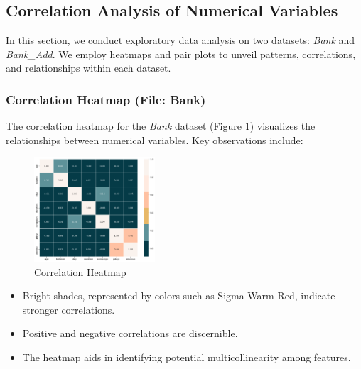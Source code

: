 \documentclass{article}
\begin{document}
\subsection{Correlation Analysis of Numerical Variables}
In this section, we conduct exploratory data analysis on two datasets: \textit{Bank} and \textit{Bank\_Add}. We employ heatmaps and pair plots to unveil patterns, correlations, and relationships within each dataset.


 \subsubsection{Correlation Heatmap (File: Bank)}
 
 The correlation heatmap for the \textit{Bank} dataset (Figure \ref{fig:heatmap_bank}) visualizes the relationships between numerical variables. Key observations include:
 \\

 \begin{figure}[h]
                \centering
                \includegraphics[width=0.4\textwidth]{data/bank_marketing/pic/Bank_Corr.png}
                \caption{Correlation Heatmap}
                \label{fig:heatmap_bank}
            \end{figure}
\begin{itemize}
    \item Bright shades, represented by colors such as Sigma Warm Red, indicate stronger correlations.
    \item Positive and negative correlations are discernible.
    \item The heatmap aids in identifying potential multicollinearity among features.
\end{itemize}
\end{document}
